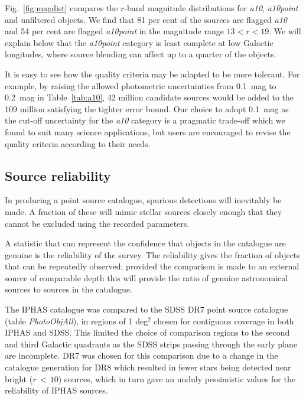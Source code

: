 \documentclass[a4paper,useAMS,usenatbib]{mn2e}
\begin{document}
{Fig.~\ref{fig:magdist} compares the $r$-band magnitude
distributions for \emph{a10}, \emph{a10point}
and unfiltered objects.
We find that 81 per cent of the sources 
are flagged \emph{a10}
and 54 per cent are flagged \emph{a10point}
in the magnitude range $13 < r < 19$.
We will explain below that the
\emph{a10point} category is least complete
at low Galactic longitudes,
where source blending can affect
up to a quarter of the objects.

It is easy to see how the quality criteria
may be adapted to be more tolerant.
For example, by raising the allowed photometric uncertainties
from 0.1~mag to 0.2~mag in Table~\ref{tab:a10},
42 million candidate sources would be added to the 109 
million satisfying the tighter error bound.
Our choice to adopt 0.1~mag as the cut-off uncertainty
for the \emph{a10} category is a pragmatic trade-off
which we found to suit many science applications,
but users are encouraged 
to revise the quality criteria according to their needs.



\subsection{Source reliability}
\label{sec:reliability}

In producing a point source catalogue, spurious detections 
will inevitably be made. A fraction of these will mimic stellar 
sources closely enough that they cannot be excluded using the 
recorded parameters. 


A statistic that can represent the confidence that objects in the 
catalogue are genuine is the reliability of the survey. The 
reliability gives the fraction of objects that can be repeatedly 
observed; provided the comparison is made to an external source of 
comparable depth this will provide the ratio of genuine astronomical 
sources to sources in the catalogue.

The IPHAS catalogue was compared to the SDSS DR7 point source 
catalogue (table \emph{PhotoObjAll}), in regions of 1 deg$^2$ 
chosen for contiguous coverage in both IPHAS and SDSS. This limited 
the choice of comparison regions to the second and third Galactic 
quadrants as the SDSS strips passing through the early plane are 
incomplete. DR7 was chosen for this comparison due to a change in 
the catalogue generation for DR8 which resulted in fewer stars being 
detected near bright ($r\,<\,10$) sources, which in turn gave an unduly 
pessimistic values for the reliability of IPHAS sources.

}
\end{document}

